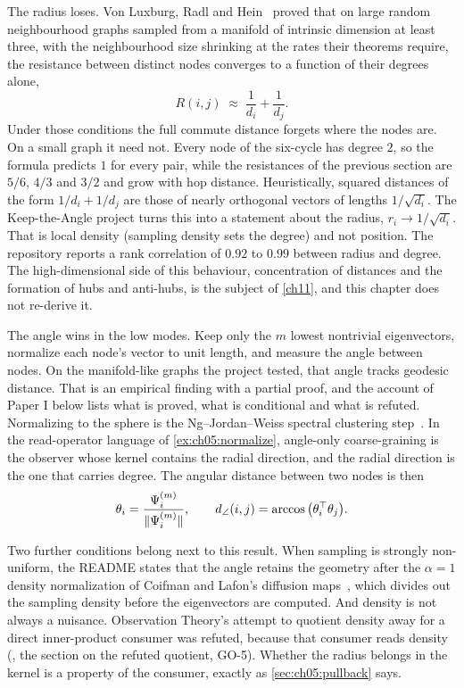 The radius loses. Von Luxburg, Radl and Hein~\cite{vonluxburg2014} proved that on large random neighbourhood graphs sampled from a manifold of intrinsic dimension at least three, with the neighbourhood size shrinking at the rates their theorems require, the resistance between distinct nodes converges to a function of their degrees alone,
\begin{equation}\label{eq:ch05:degenerate}
R(i,j)\;\approx\;\frac1{d_i}+\frac1{d_j}.
\end{equation}
Under those conditions the full commute distance forgets where the nodes are. On a small graph it need not. Every node of the six-cycle has degree $2$, so the formula predicts $1$ for every pair, while the resistances of the previous section are $5/6$, $4/3$ and $3/2$ and grow with hop distance. Heuristically, squared distances of the form $1/d_i+1/d_j$ are those of nearly orthogonal vectors of lengths $1/\sqrt{d_i}$. The Keep-the-Angle project turns this into a statement about the radius, $r_i\to1/\sqrt{d_i}$. That is local density (sampling density sets the degree) and not position. The repository reports a rank correlation of $0.92$ to $0.99$ between radius and degree. The high-dimensional side of this behaviour, concentration of distances and the formation of hubs and anti-hubs, is the subject of \cref{ch11}, and this chapter does not re-derive it.

The angle wins in the low modes. Keep only the $m$ lowest nontrivial eigenvectors, normalize each node's vector to unit length, and measure the angle between nodes. On the manifold-like graphs the project tested, that angle tracks geodesic distance. That is an empirical finding with a partial proof, and the account of Paper I below lists what is proved, what is conditional and what is refuted. Normalizing to the sphere is the Ng--Jordan--Weiss spectral clustering step~\cite{ng2002}. In the read-operator language of \cref{ex:ch05:normalize}, angle-only coarse-graining is the observer whose kernel contains the radial direction, and the radial direction is the one that carries degree.
The angular distance between two nodes is then
\begin{equation}\label{eq:ch05:angle}
\theta_i=\frac{\Psi^{(m)}_i}{\lVert \Psi^{(m)}_i\rVert},\qquad d_{\angle}(i,j)=\arccos\big(\theta_i^{\top}\theta_j\big).
\end{equation}

Two further conditions belong next to this result. When sampling is strongly non-uniform, the README states that the angle retains the geometry after the $\alpha=1$ density normalization of Coifman and Lafon's diffusion maps~\cite{coifman2006}, which divides out the sampling density before the eigenvectors are computed. And density is not always a nuisance. Observation Theory's attempt to quotient density away for a direct inner-product consumer was refuted, because that consumer reads density (, the section on the refuted quotient, GO-5). Whether the radius belongs in the kernel is a property of the consumer, exactly as \cref{sec:ch05:pullback} says.

